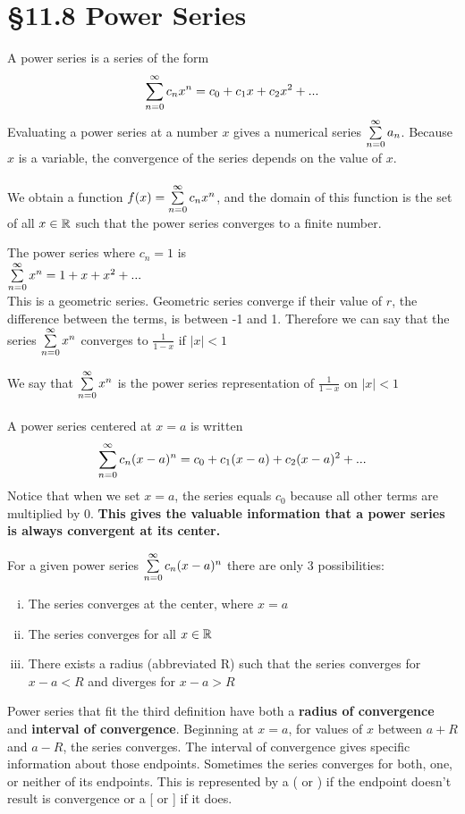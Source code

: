 \documentclass[12 pt]{article}
\begin{document}
	\section{\S 11.8 Power Series}
		\begin{def*}
			A power series is a series of the form
			$$\sum\limits_{n=0}^{\infty} c_nx^n=c_0+c_1x+c_2x^2+...$$
			Evaluating a power series at a number $x$ gives a numerical series $\sum\limits_{n=0}^{\infty} a_n$. Because $x$ is a variable, the convergence of the series depends on the value of $x$.\\\\
			We obtain a function $f(x)=\sum\limits_{n=0}^{\infty} c_nx^n$, and the domain of this function is the set of all $x\in\mathbb{R}$ such that the power series converges to a finite number.
		\end{def*}
		\begin{exmp*}
			The power series where $c_n=1$ is\\
			$\sum\limits_{n=0}^{\infty} x^n=1+x+x^2+...$\\
			This is a geometric series. Geometric series converge if their value of $r$, the difference between the terms, is between -1 and 1. Therefore we can say that the series $\sum\limits_{n=0}^{\infty} x^n$ converges to $\frac{1}{1-x}$ if $\left|x\right|<1$
		\end{exmp*}
		We say that $\sum\limits_{n=0}^{\infty} x^n$ is the power series representation of $\frac{1}{1-x}$ on $\left|x\right|<1$\\\\
		A power series centered at $x=a$ is written
		$$\sum\limits_{n=0}^{\infty} c_n(x-a)^n=c_0+c_1(x-a)+c_2(x-a)^2+...$$
		Notice that when we set $x=a$, the series equals $c_0$ because all other terms are multiplied by 0. \textbf{This gives the valuable information that a power series is always convergent at its center.}
		\begin{thrm}
			For a given power series $\sum\limits_{n=0}^{\infty} c_n(x-a)^n$ there are only 3 possibilities:
			\begin{enumerate}[i)]
				\item The series converges at the center, where $x=a$
				\item The series converges for all $x\in\mathbb{R}$
				\item There exists a radius (abbreviated R) such that the series converges for $x-a<R$ and diverges for $x-a>R$
			\end{enumerate}
		\end{thrm}
		Power series that fit the third definition have both a \textbf{radius of convergence} and \textbf{interval of convergence}. Beginning at $x=a$, for values of $x$ between $a+R$ and $a-R$, the series converges. The interval of convergence gives specific information about those endpoints. Sometimes the series converges for both, one, or neither of its endpoints. This is represented by a ( or ) if the endpoint doesn't result is convergence or a [ or ] if it does.\\\\
\end{document}
